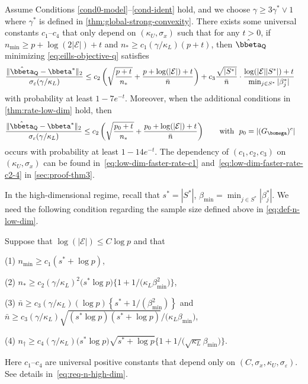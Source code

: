 \documentclass[10pt]{article}
\numberwithin{equation}{section}
\begin{document}
\begin{theorem} 
\label{thm:rate-faster-low-dim}
Assume Conditions \ref{cond0-model}--\ref{cond-ident} hold, and we choose $\gamma \ge 3\gamma^*\lor 1$ where $\gamma^*$ is defined in \cref{thm:global-strong-convexity}. There exists some universal constants $c_1$--$c_4$  that only depend on $(\kappa_U, \sigma_x)$ such that for any $t>0$, if $n_{\min} \ge p + \log(2|\mathcal{E}|) + t$ and $n_* \ge c_1 (\gamma/\kappa_L)(p + t)$, then $\hat{\bbeta}_{\mathsf{Q}}$ minimizing \eqref{eq:eills-objective-q} satisfies
\begin{align}
\label{eq:low-dim-rate2}
    \frac{\|\hat{\bbeta}_{\mathsf{Q}} - \bbeta^*\|_2}{\sigma_\varepsilon (\gamma/\kappa_L)}  &\le c_2 \left(\sqrt{\frac{p+t}{n_*}} + \frac{p+\log(|\mathcal{E}|)+t}{\bar{n}}\right) + c_3 \frac{\sqrt{|S^*|}}{\bar{n}} \cdot \frac{\log(|\mathcal{E}||S^*|)+t}{\min_{j\in S^*}|\beta^*_j|}
\end{align} with probability at least $1-7e^{-t}$. Moreover, when the additional conditions in \cref{thm:rate-low-dim} hold, then
\begin{align}
\label{eq:low-dim-rate1}
    \frac{\|\hat{\bbeta}_{\mathsf{Q}} - \bbeta^*\|_2}{\sigma_\varepsilon (\gamma/\kappa_L)}  &\le c_2 \left(\sqrt{\frac{p_0+t}{n_*}} + \frac{p_0+\log(|\mathcal{E}|)+t}{\bar{n}}\right) \qquad \text{with}~~p_0 = |({G}_{\bomega})^c|
\end{align} occurs with probability at least $1-14e^{-t}$. The dependency of $(c_1,c_2,c_3)$ on $(\kappa_U,\sigma_x)$ can be found in~\eqref{eq:low-dim-faster-rate-c1} and~{\eqref{eq:low-dim-faster-rate-c2-4}} in \cref{sec:proof-thm3}. 
\end{theorem} 

In the high-dimensional regime, recall that $s^* = |S^*|$, $\beta_{\min} = \min_{j\in S^*} |\beta_j^*|$. We need the following condition regarding the sample size defined above in \eqref{eq:def-n-low-dim}.


\begin{condition}
\label{cond6-n-req}
    Suppose that $\log(|\mathcal{E}|)\le C\log p$ and that 
    
\noindent (1) $n_{\min} \ge c_1 (s^* + \log p)$,
    
\noindent (2) $n_* \ge c_2 (\gamma/\kappa_L)^2 \Big(s^* \log p \Big) \Big\{1 + 1\big/ \big(\kappa_L \beta_{\min}^2 \big)\Big\}$, 
    
\noindent (3) $\bar{n} \ge c_3 (\gamma/\kappa_L) (\log p) \left\{s^* + 1/ (\beta_{\min}^2)\right\}$ and $\bar{n} \ge c_3 (\gamma/\kappa_L) \sqrt{(s^*\log p)(s^* + \log p)} \big/ \big(\kappa_L \beta_{\min} \big)$, 
    
\noindent (4) $n_\dagger \ge c_4(\gamma/\kappa_L) \big(s^* \log p \big)\sqrt{s^* + \log p}\Big\{1+1\big/ \big(\sqrt{\kappa_L} \beta_{\min}\big)\Big\}$.
    
\noindent Here $c_1$--$c_4$ are universal positive constants that depend only on $(C,\sigma_x,\kappa_U, \sigma_\varepsilon)$. See details in~{\eqref{eq:req-n-high-dim}}.
\end{condition}
\end{document}
